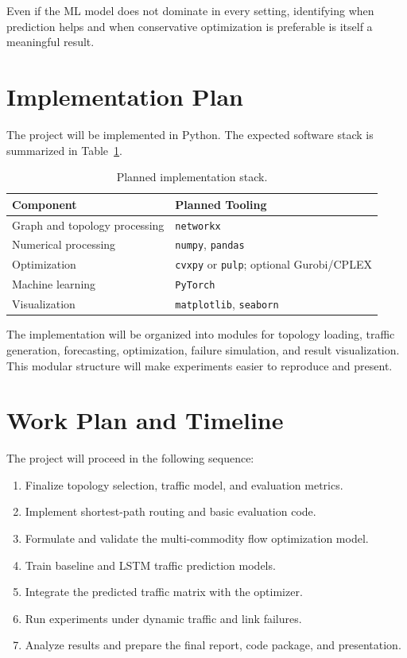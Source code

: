 \documentclass[11pt]{article}
\begin{document}
Even if the ML model does not dominate in every setting, identifying when prediction helps and when conservative optimization is preferable is itself a meaningful result.

\section{Implementation Plan}
The project will be implemented in Python. The expected software stack is summarized in Table~\ref{tab:stack}.

\begin{table}[h]
\centering
\begin{tabular}{ll}
\toprule
\textbf{Component} & \textbf{Planned Tooling} \\
\midrule
Graph and topology processing & \texttt{networkx} \\
Numerical processing & \texttt{numpy}, \texttt{pandas} \\
Optimization & \texttt{cvxpy} or \texttt{pulp}; optional Gurobi/CPLEX \\
Machine learning & \texttt{PyTorch} \\
Visualization & \texttt{matplotlib}, \texttt{seaborn} \\
\bottomrule
\end{tabular}
\caption{Planned implementation stack.}
\label{tab:stack}
\end{table}

The implementation will be organized into modules for topology loading, traffic generation, forecasting, optimization, failure simulation, and result visualization. This modular structure will make experiments easier to reproduce and present.

\section{Work Plan and Timeline}
The project will proceed in the following sequence:
\begin{enumerate}
    \item Finalize topology selection, traffic model, and evaluation metrics.
    \item Implement shortest-path routing and basic evaluation code.
    \item Formulate and validate the multi-commodity flow optimization model.
    \item Train baseline and LSTM traffic prediction models.
    \item Integrate the predicted traffic matrix with the optimizer.
    \item Run experiments under dynamic traffic and link failures.
    \item Analyze results and prepare the final report, code package, and presentation.
\end{enumerate}
\end{document}
